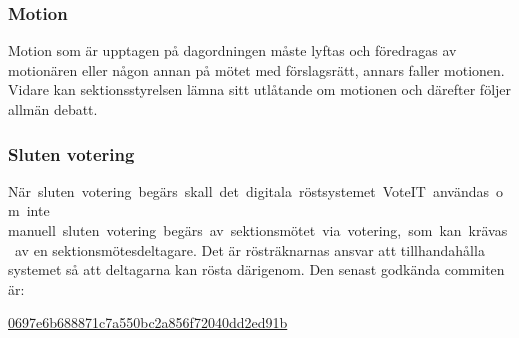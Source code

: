 \subsubsection{Motion}
Motion som är upptagen på dagordningen måste lyftas och föredragas av motionären 
eller någon annan på mötet med förslagsrätt, annars faller motionen. Vidare kan 
sektionsstyrelsen lämna sitt utlåtande om motionen och därefter följer allmän debatt.

\subsubsection{Sluten votering}
När sluten votering begärs skall det digitala röstsystemet VoteIT användas om inte
manuell sluten votering begärs av sektionsmötet via votering, som kan krävas av
en sektionsmötesdeltagare. Det är rösträknarnas ansvar att tillhandahålla systemet så att
deltagarna kan rösta därigenom. Den senast godkända commiten är:

\href{https://github.com/cthit/VoteIT/commit/0697e6b688871c7a550bc2a856f72040dd2ed91b}{0697e6b688871c7a550bc2a856f72040dd2ed91b}
